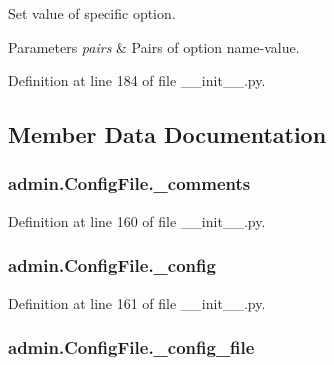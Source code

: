 Set value of specific option. 


\begin{DoxyParams}{Parameters}
{\em pairs} & Pairs of option name-\/value. \\
\hline
\end{DoxyParams}


Definition at line 184 of file \-\_\-\-\_\-init\-\_\-\-\_\-.\-py.



\subsection{Member Data Documentation}
\hypertarget{classadmin_1_1ConfigFile_ac15829b16933412a7db88d3dacdcf345}{
\subsubsection[{\-\_\-comments}]{\setlength{\rightskip}{0pt plus 5cm}admin.\-Config\-File.\-\_\-comments\hspace{0.3cm}{\ttfamily [private]}}}\label{classadmin_1_1ConfigFile_ac15829b16933412a7db88d3dacdcf345}


Definition at line 160 of file \-\_\-\-\_\-init\-\_\-\-\_\-.\-py.

\hypertarget{classadmin_1_1ConfigFile_a5a5c415d13ee87e1a03c9f64231a4fc9}{
\subsubsection[{\-\_\-config}]{\setlength{\rightskip}{0pt plus 5cm}admin.\-Config\-File.\-\_\-config\hspace{0.3cm}{\ttfamily [private]}}}\label{classadmin_1_1ConfigFile_a5a5c415d13ee87e1a03c9f64231a4fc9}


Definition at line 161 of file \-\_\-\-\_\-init\-\_\-\-\_\-.\-py.

\hypertarget{classadmin_1_1ConfigFile_ada03146a25635d360b9994efcd3eb6ce}{
\subsubsection[{\-\_\-config\-\_\-file}]{\setlength{\rightskip}{0pt plus 5cm}admin.\-Config\-File.\-\_\-config\-\_\-file\hspace{0.3cm}{\ttfamily [private]}}}\label{classadmin_1_1ConfigFile_ada03146a25635d360b9994efcd3eb6ce}


